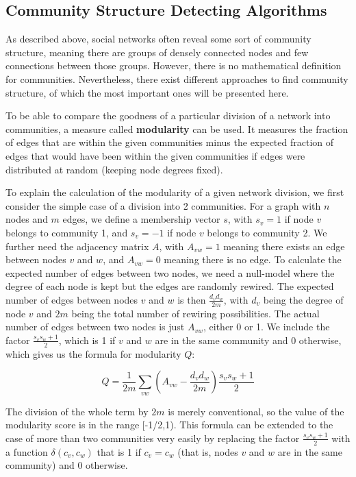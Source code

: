 \subsection{Community Structure Detecting Algorithms}
\label{sst:communityalgorithms} As described above, social networks often reveal some sort of community structure, meaning there are groups of densely connected nodes and few connections between those groups. However, there is no mathematical definition for communities. Nevertheless, there exist different approaches to find community structure, of which the most important ones will be presented here.

To be able to compare the goodness of a particular division of a network into communities, a measure called \textbf{modularity} can be used. It measures the fraction of edges that are within the given communities minus the expected fraction of edges that would have been within the given communities if edges were distributed at random (keeping node degrees fixed). 

To explain the calculation of the modularity of a given network division, we first consider the simple case of a division into 2 communities. For a graph with $n$ nodes and $m$ edges, we define a membership vector $s$, with $s_v = 1$ if node $v$ belongs to community 1, and $s_v = -1$ if node $v$ belongs to community 2. We further need the adjacency matrix $A$, with $A_{vw} = 1$ meaning there exists an edge between nodes $v$ and $w$, and $A_{vw} = 0$ meaning there is no edge. To calculate the expected number of edges between two nodes, we need a null-model where the degree of each node is kept but the edges are randomly rewired. The expected number of edges between nodes $v$ and $w$ is then $\frac{d_v d_w}{2m}$, with $d_v$ being the degree of node $v$ and $2m$ being the total number of rewiring possibilities. The actual number of edges between two nodes is just $A_{vw}$, either 0 or 1. We include the factor $\frac{s_v s_w  + 1}{2}$, which is 1 if $v$ and $w$ are in the same community and 0 otherwise, which gives us the formula for modularity $Q$:

\begin{equation}
Q = \frac{1}{2m} \sum_{vw}(A_{vw} - \frac{d_v d_w}{2m}) \frac{s_v s_w  + 1}{2}
\label{eq:modularity}
\end{equation}

The division of the whole term by $2m$ is merely conventional, so the value of the modularity score is in the range [-1/2,1). This formula can be extended to the case of more than two communities very easily by replacing the factor $\frac{s_v s_w  + 1}{2}$ with a function $\delta(c_v, c_w)$ that is 1 if $c_v = c_w$ (that is, nodes $v$ and $w$ are in the same community) and 0 otherwise.


